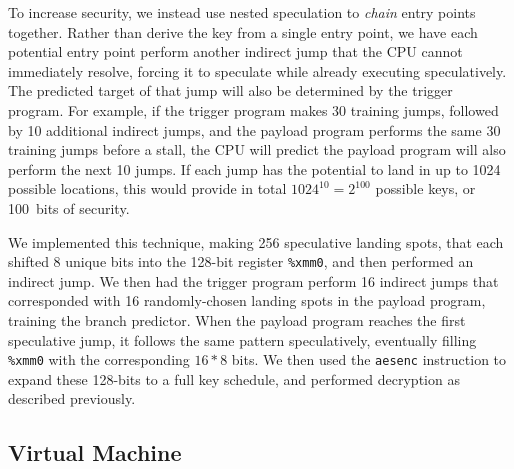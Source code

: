 To increase security, we instead use nested speculation to \emph{chain} entry points
together. Rather than derive
the key from a single entry point, we have each potential entry point perform
another indirect jump that the CPU cannot immediately resolve, forcing it to
speculate while already executing speculatively. The predicted target of that jump
will also be determined by the trigger program. For example, if the trigger
program makes 30 training jumps, followed by 10 additional indirect jumps, and
the payload program performs the same 30 training jumps before a stall, the CPU
will predict the payload program will also perform the next 10 jumps. If each
jump has the potential to land in up to 1024 possible locations, this would
provide in total $1024^{10} = 2^{100}$ possible keys, or 100~bits of security.

\smallskip

We implemented this technique, making 256 speculative landing spots, that each
shifted 8 unique bits into the 128-bit register \texttt{\%xmm0}, and then
performed an indirect jump. We then had the trigger program perform 16
indirect jumps that corresponded with 16 randomly-chosen landing spots in the
payload program, training the branch predictor. When the payload program reaches the
first speculative jump, it follows the same pattern speculatively, 
eventually filling
\texttt{\%xmm0} with the corresponding $16*8$ bits. We then used
the \texttt{aesenc} instruction to expand these 128-bits to a full
key schedule, and performed decryption as described previously.




\FigSpecBandwidth

\subsection{Virtual Machine}
\label{subsec:spasm}


